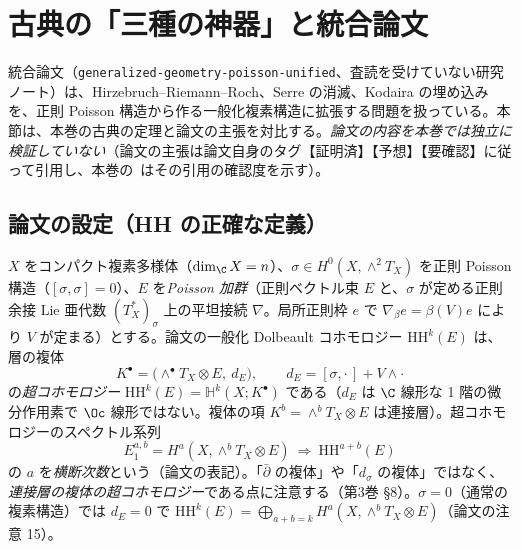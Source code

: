 
\section{古典の「三種の神器」と統合論文}\label{sec:unified}

統合論文（\texttt{generalized-geometry-poisson-unified}、査読を受けていない研究ノート）は、Hirzebruch--Riemann--Roch、Serre の消滅、Kodaira の埋め込みを、正則 Poisson 構造から作る一般化複素構造に拡張する問題を扱っている。本節は、本巻の古典の定理と論文の主張を対比する。\emph{論文の内容を本巻では独立に検証していない}（論文の主張は論文自身のタグ【証明済】【予想】【要確認】に従って引用し、本巻の\tQ\ はその引用の確認度を示す）。

\subsection{論文の設定（HH の正確な定義）}
$X$ をコンパクト複素多様体（$\dim_\C X=n$）、$\sigma\in H^0(X,\wedge^2T_X)$ を正則 Poisson 構造（$[\sigma,\sigma]=0$）、$E$ を\emph{Poisson 加群}（正則ベクトル束 $E$ と、$\sigma$ が定める正則余接 Lie 亜代数 $(T_X^*)_\sigma$ 上の平坦接続 $\nabla$。局所正則枠 $e$ で $\nabla_\beta e=\beta(V)e$ により $V$ が定まる）とする。論文の一般化 Dolbeault コホモロジー $\mathrm{HH}^k(E)$ は、層の複体
\[
K^\bullet=\big(\wedge^\bullet T_X\otimes E,\ d_E\big),\qquad d_E=[\sigma,\cdot\,]+V\wedge\cdot
\]
の\emph{超コホモロジー} $\mathrm{HH}^k(E)=\mathbb H^k(X;K^\bullet)$ である（$d_E$ は $\C$ 線形な 1 階の微分作用素で $\Oc$ 線形ではない。複体の項 $K^b=\wedge^bT_X\otimes E$ は連接層）。超コホモロジーのスペクトル系列
\[
E_1^{a,b}=H^a(X,\wedge^bT_X\otimes E)\ \Longrightarrow\ \mathrm{HH}^{a+b}(E)
\]
の $a$ を\emph{横断次数}という（論文の表記）。「$\bar\partial$ の複体」や「$d_\sigma$ の複体」ではなく、\emph{連接層の複体の超コホモロジー}である点に注意する（第3巻 \S8）。$\sigma=0$（通常の複素構造）では $d_E=0$ で $\mathrm{HH}^k(E)=\bigoplus_{a+b=k}H^a(X,\wedge^bT_X\otimes E)$（論文の注意 15）。

